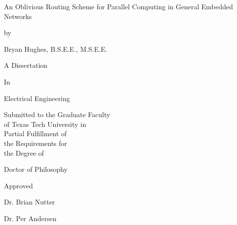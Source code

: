 \begin{titlepage}
\begin{centering}

\LARGE An Oblivious Routing Scheme for Parallel Computing in General Embedded Networks

\vspace{18pt}

\normalsize by\\

\vspace{8pt}

\large Bryan Hughes, B.S.E.E., M.S.E.E.\\

\vspace{18pt}

\normalsize A Dissertation \\

\vspace{8pt}

In\\

\vspace{8pt}

Electrical Engineering\\

\vspace{18pt}

Submitted to the Graduate Faculty\\
of Texas Tech University in\\
Partial Fulfillment of\\
the Requirements for\\
the Degree of\\

\vspace{18pt}

Doctor of Philosophy\\

\vspace{18pt}

Approved\\

\vspace{8pt}

Dr. Brian Nutter\\

\vspace{8pt}

Dr. Per Andersen\\

\vspace{8pt}


\end{centering}
\end{titlepage}
